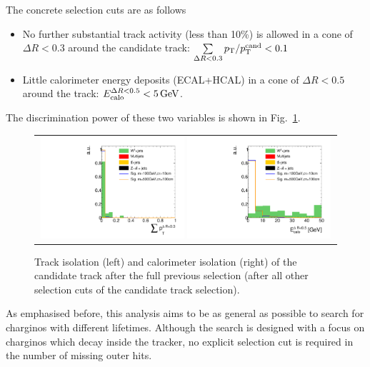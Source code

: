 The concrete selection cuts are as follows
\begin{itemize}
\renewcommand{\labelitemi}{\footnotesize{\ding{118}}}
\item No further substantial track activity (less than 10\%) is allowed in a cone of $\Delta R < 0.3$ around the candidate track: \mbox{$\sum \limits_{\Delta R < 0.3} p_{\text{T}}/p_{\text{T}}^{\text{cand}} < 0.1$}
\item Little calorimeter energy deposits (ECAL+HCAL) in a cone of $\Delta R < 0.5$ around the track: \mbox{$E^{\Delta R<0.5}_{\text{calo}}<5\,\text{Ge}\kern-0.06667em\text{V}$}.
\end{itemize}
The discrimination power of these two variables is shown in Fig.~\ref{fig:TrackIso_Ecalo_After_Preselection}.\\
\begin{figure}[!t]
  \centering 
  \begin{tabular}{c}
    \includegraphics[width=0.49\textwidth]{figures/analysis/AnalysisSelection/chiTracksCandidateSelectionTrigger_2Signals_FullBkg/htrackIsolationSmallRange_lin.pdf}
    \includegraphics[width=0.49\textwidth]{figures/analysis/AnalysisSelection/chiTracksCandidateSelectionTrigger_2Signals_FullBkg/htrackCaloIsolation_lin.pdf}
  \end{tabular}
  \caption{Track isolation (left) and calorimeter isolation (right) of the candidate track after the full previous selection (after all other selection cuts of the candidate track selection).}
  \label{fig:TrackIso_Ecalo_After_Preselection}
\end{figure}

As emphasised before, this analysis aims to be as general as possible to search for charginos with different lifetimes.
Although the search is designed with a focus on charginos which decay inside the tracker, no explicit selection cut is required in the number of missing outer hits.


